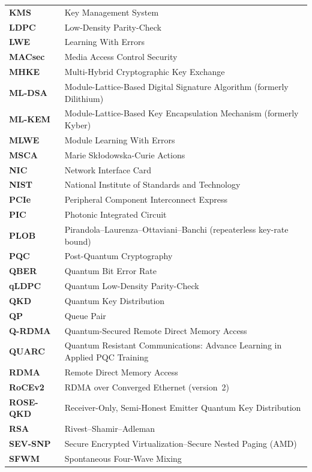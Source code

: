 \begin{longtable}{@{}p{}@{\hspace{1em}}p{}@{}}
\textbf{KMS} & Key Management System \\
\textbf{LDPC} & Low-Density Parity-Check \\
\textbf{LWE} & Learning With Errors \\
\textbf{MACsec} & Media Access Control Security \\
\textbf{MHKE} & Multi-Hybrid Cryptographic Key Exchange \\
\textbf{ML-DSA} & Module-Lattice-Based Digital Signature Algorithm (formerly Dilithium) \\
\textbf{ML-KEM} & Module-Lattice-Based Key Encapsulation Mechanism (formerly Kyber) \\
\textbf{MLWE} & Module Learning With Errors \\
\textbf{MSCA} & Marie Sk\l{}odowska-Curie Actions \\
\textbf{NIC} & Network Interface Card \\
\textbf{NIST} & National Institute of Standards and Technology \\
\textbf{PCIe} & Peripheral Component Interconnect Express \\
\textbf{PIC} & Photonic Integrated Circuit \\
\textbf{PLOB} & Pirandola--Laurenza--Ottaviani--Banchi (repeaterless key-rate bound) \\
\textbf{PQC} & Post-Quantum Cryptography \\
\textbf{QBER} & Quantum Bit Error Rate \\
\textbf{qLDPC} & Quantum Low-Density Parity-Check \\
\textbf{QKD} & Quantum Key Distribution \\
\textbf{QP} & Queue Pair \\
\textbf{Q-RDMA} & Quantum-Secured Remote Direct Memory Access \\
\textbf{QUARC} & Quantum Resistant Communications: Advance Learning in Applied PQC Training \\
\textbf{RDMA} & Remote Direct Memory Access \\
\textbf{RoCEv2} & RDMA over Converged Ethernet (version~2) \\
\textbf{ROSE-QKD} & Receiver-Only, Semi-Honest Emitter Quantum Key Distribution \\
\textbf{RSA} & Rivest--Shamir--Adleman \\
\textbf{SEV-SNP} & Secure Encrypted Virtualization--Secure Nested Paging (AMD) \\
\textbf{SFWM} & Spontaneous Four-Wave Mixing \\

\end{longtable}
